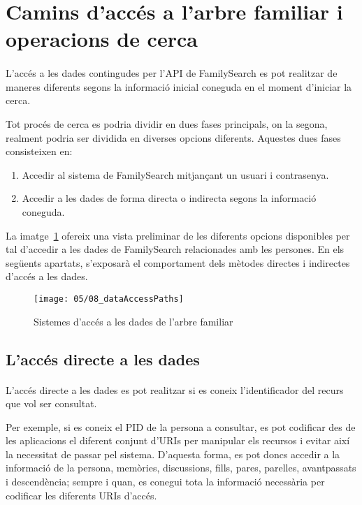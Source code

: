 \section{Camins d'accés a l'arbre familiar i operacions de cerca}

    \paragraph{}
    L'accés a les dades contingudes per l'API de FamilySearch es pot realitzar de maneres diferents segons la informació inicial coneguda en el moment d’iniciar la cerca.

    Tot procés de cerca es podria dividir en dues fases principals, on la segona, realment podria ser dividida en diverses opcions diferents. Aquestes dues fases consisteixen en:

    \begin{enumerate}
        \item Accedir al sistema de FamilySearch mitjançant un usuari i contrasenya.
        \item Accedir a les dades de forma directa o indirecta segons la informació coneguda.
    \end{enumerate}

    La imatge~\ref{fig:dataAcessPath} ofereix una vista preliminar de les diferents opcions disponibles per tal d'accedir a les dades de FamilySearch relacionades amb les persones. En els següents apartats, s'exposarà el comportament dels mètodes directes i indirectes d'accés a les dades.

    \begin{figure}[h]
        \texttt{[image: 05/08\_dataAccessPaths]}
        \centering
        \caption{Sistemes d'accés a les dades de l'arbre familiar}\label{fig:dataAcessPath}
    \end{figure}


    \subsection{L'accés directe a les dades}

        \paragraph{}
        L'accés directe a les dades es pot realitzar si es coneix l'identificador del recurs que vol ser consultat.

        Per exemple, si es coneix el PID de la persona a consultar, es pot codificar des de les aplicacions el diferent conjunt d'URIs per manipular els recursos i evitar així la necessitat de passar pel sistema. D'aquesta forma, es pot doncs accedir a la informació de la persona, memòries, discussions, fills, pares, parelles, avantpassats i descendència; sempre i quan, es conegui tota la informació necessària per codificar les diferents URIs d'accés.

